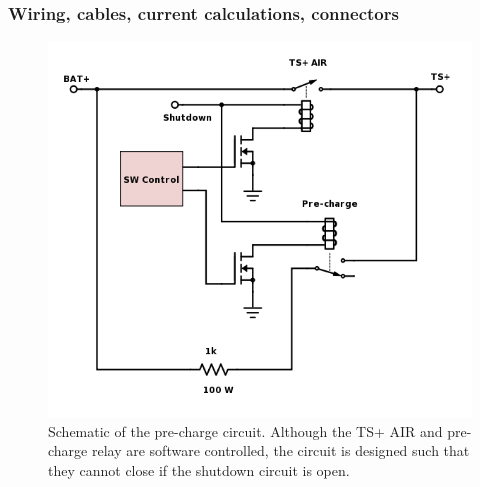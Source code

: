 \documentclass{article}
\begin{document}
\subsubsection{Wiring, cables, current calculations, connectors}

\begin{figure}[H]
    \centering
    \includegraphics[width = 0.7 \textwidth]{precharge_schem}
    \caption{Schematic of the pre-charge circuit. Although the TS+ AIR and pre-charge relay are software controlled, the circuit is designed such that they cannot close if the shutdown circuit is open.}
    \label{fig:precharge_schem}
\end{figure}
\end{document}
